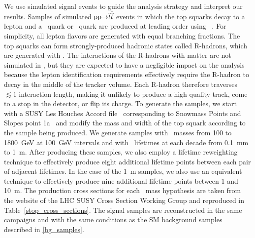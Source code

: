 We use simulated signal events to guide the analysis strategy and interpret our results. Samples of simulated $\mathrm{p}\mathrm{p} {\to} \widetilde{t} \overline{\widetilde{t}}$ events in which the top squarks decay to a lepton and a \cPqb\ quark or \cPqd\ quark are produced at leading order using ~\cite{PYTHIA8}. For simplicity, all lepton flavors are generated with equal branching fractions. The top squarks can form strongly-produced hadronic states called R-hadrons, which are generated with \PYTHIA. The interactions of the R-hadrons with matter are not simulated in \GEANTfour, but they are expected to have a negligible impact on the analysis because the lepton identification requirements effectively require the R-hadron to decay in the middle of the tracker volume. Each R-hadron therefore traverses $\lesssim1$ interaction length, making it unlikely to produce a high quality track, come to a stop in the detector, or flip its charge. To generate the samples, we start with a SUSY Les Houches Accord file~\cite{LesHouches} corresponding to Snowmass Points and Slopes point 1a~\cite{snowmass_points_slopes} and modify the mass and width of the top squark according to the sample being produced. We generate samples with \PSQt\ masses from \num{100} to \SI{1800}{\GeV} at \SI{100}{\GeV} intervals and with \PSQt\ lifetimes at each decade from \SI{0.1}{\mm} to \SI{1}{m}. After producing these samples, we also employ a lifetime reweighting technique to effectively produce eight additional lifetime points between each pair of adjacent lifetimes. In the case of the 1~m samples, we also use an equivalent technique to effectively produce nine additional lifetime points between \num{1} and \SI{10}{\m}. The production cross sections for each \PSQt\ mass hypothesis are taken from the website of the LHC SUSY Cross Section Working Group and reproduced in Table~\ref{stop_cross_sections}. The signal samples are reconstructed in the same campaigns and with the same conditions as the SM background samples described in \ref{bg_samples}.




\pagebreak